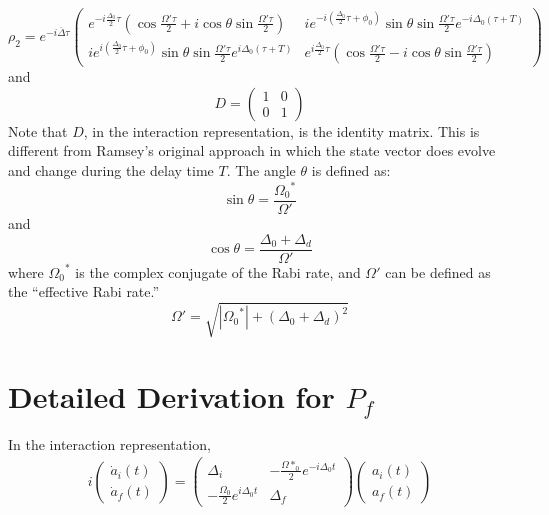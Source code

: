 \documentclass{article}
\begin{document}
\noindent 
\[
\rho_2 = e^{-i\overline\Delta\tau}
\begin{pmatrix}
e^{-i\frac{\Delta_0}{2}\tau}\left(\cos\frac{\Omega'\tau}{2} + i\cos\theta\sin\frac{\Omega'\tau}{2}\right)  
& ie^{-i\left(\frac{\Delta_0}{2}\tau + \phi_0 \right)} \sin\theta\sin\frac{\Omega'\tau}{2}e^{-i\Delta_0(\tau+T)}
\\
ie^{i\left(\frac{\Delta_0}{2}\tau + \phi_0 \right)} \sin\theta\sin\frac{\Omega'\tau}{2}e^{i\Delta_0(\tau+T)}
& 
e^{i\frac{\Delta_0}{2}\tau}\left(\cos\frac{\Omega'\tau}{2} - i\cos\theta\sin\frac{\Omega'\tau}{2}\right)  
\end{pmatrix}\]
\noindent
and 
\[D
=
\begin{pmatrix}
1 & 0 \\ 0 & 1
\end{pmatrix}
\]
\noindent
Note that $D$, in the interaction representation, is the identity matrix. This is different from Ramsey's original approach in which the state vector does evolve and change during the delay time $T$. The angle $\theta$ is defined as:
\[
\sin\theta = \frac{{\Omega_0}^*}{\Omega'}
\]
\noindent
and
\[
\cos\theta = \frac{\Delta_0 + \Delta_d}{\Omega'}
\]
\noindent
where ${\Omega_0}^*$ is the complex conjugate of the Rabi rate, and $\Omega'$ can be defined as the ``effective Rabi rate.''
\[
\Omega'= \sqrt{|{\Omega_0}^*| + (\Delta_0 + \Delta_d)^2}
\]
\newpage

\section{Detailed Derivation for $P_f$}
In the interaction representation,
\begin{align}
i\begin{pmatrix}
\dot{a}_i(t)\\
\dot{a}_f(t)
\end{pmatrix}
=
\begin{pmatrix}
\Delta_i & -\frac{\Omega*_0}{2}e^{-i\Delta_0t}\\
-\frac{\Omega_0}{2}e^{i\Delta_0t} & \Delta_f
\end{pmatrix}
\begin{pmatrix}
a_i(t)\\
a_f(t)
\end{pmatrix}
\end{align}
\end{document}

